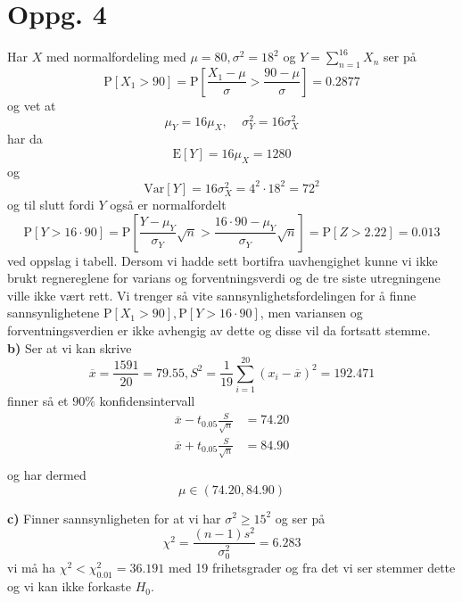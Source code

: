\documentclass{report}
\newcommand{\nbrack}[1]{\left( #1 \right)}
\newcommand{\bbrack}[1]{\left[ #1 \right]}
\newcommand{\Var}[1]{\text{Var} \bbrack{ #1 }}
\newcommand{\std}[1]{\text{E} \bbrack{ #1 }}
\newcommand{\Prob}[1]{\text{P} \bbrack{ #1 }}
\begin{document}
\section*{Oppg. 4}
Har $X$ med normalfordeling med $\mu = 80, \sigma^{2} = 18^{2}$ og $Y = \sum_{n=1}^{16} X_{n}$ ser på
\begin{equation}
  \label{eq:17}
  \Prob{X_{1} > 90} = \Prob{\frac{X_{1} - \mu}{\sigma} > \frac{90-\mu}{\sigma}} = 0.2877
\end{equation}
og vet at
\begin{equation}
  \label{eq:21}
  \mu_{Y} = 16 \mu_{X}, \;\;\;\; \sigma_{Y}^{2} = 16\sigma_{X}^{2}
\end{equation}
har da
\begin{equation}
  \label{eq:22}
  \std{Y} = 16\mu_{X} = 1280
\end{equation}
og
\begin{equation}
  \label{eq:23}
  \Var{Y} = 16\sigma_{X}^{2} = 4^{2} \cdot 18^{2} = 72^{2}
\end{equation}
og til slutt fordi $Y$ også er normalfordelt
\begin{equation}
  \label{eq:28}
  \Prob{Y > 16\cdot 90} = \Prob{\frac{Y-\mu_{Y}}{\sigma_{Y}}\sqrt{n} > \frac{16\cdot 90 - \mu_{Y}}{\sigma_{Y}}\sqrt{n}} = \Prob{Z > 2.22} = 0.013
\end{equation}
ved oppslag i tabell. Dersom vi hadde sett bortifra uavhengighet kunne vi ikke brukt regnereglene for varians og forventningsverdi og de tre siste utregningene ville ikke vært rett. Vi trenger så vite sannsynlighetsfordelingen for å finne sannsynlighetene $\Prob{X_{1} > 90}, \Prob{Y > 16\cdot 90}$, men variansen og forventningsverdien er ikke avhengig av dette og disse vil da fortsatt stemme. \\

\textbf{b)}
Ser at vi kan skrive
\begin{equation}
  \label{eq:29}
  \overline{x} = \frac{1591}{20} = 79.55, S^{2} = \frac{1}{19} \sum_{i=1}^{20} \nbrack{ x_{i} - \overline{x} }^{2} = 192.471
\end{equation}
finner så et $90\%$ konfidensintervall
\begin{equation}
  \label{eq:30}
  \begin{split}
    \overline{x} - t_{0.05} \frac{S}{\sqrt{n}} &= 74.20 \\
    \overline{x} + t_{0.05} \frac{S}{\sqrt{n}} &= 84.90 \\
  \end{split}
\end{equation}
og har dermed
\begin{equation}
  \label{eq:31}
  \mu \in \nbrack{74.20, 84.90}
\end{equation}

\textbf{c)}
Finner sannsynligheten for at vi har $\sigma^{2} \geq 15^{2}$ og ser på
\begin{equation}
  \label{eq:34}
  \chi^{2} = \frac{(n-1)s^{2}}{\sigma^{2}_{0}} = 6.283
\end{equation}
vi må ha $\chi^{2} < \chi_{0.01}^{2} = 36.191$ med 19 frihetsgrader og fra det vi ser stemmer dette og vi kan ikke forkaste $H_{0}$.
\end{document}

